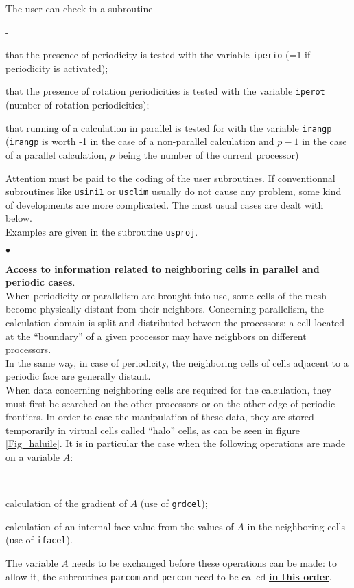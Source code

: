 {{{The user can check in a subroutine
\begin{list}{-}{}
\item that the presence of periodicity is tested with the variable
      \texttt{iperio} (=1 if periodicity is activated);
\item that the presence of rotation periodicities is tested with the variable
      \texttt{iperot} (number of rotation periodicities);
\item that running of a calculation in parallel is tested for with the
      variable \texttt{irangp} (\texttt{irangp} is worth -1 in the case of a
      non-parallel calculation and $p-1$ in the case of a parallel calculation,
      $p$ being the number of the current processor)
\end{list}
Attention must be paid to the coding of the user subroutines. If
conventionnal subroutines like \texttt{usini1} or \texttt{usclim}
usually do not cause any problem, some kind of developments are more
complicated. The most usual cases are dealt with below. \\ Examples are
given in the subroutine \texttt{usproj}.
\begin{list}{$\bullet$}{}
\item {\bf Access to information related to neighboring cells in
      parallel and periodic cases}.\\
When periodicity or parallelism are brought into use, some cells of the
      mesh become physically distant from their neighbors. Concerning
      parallelism, the calculation domain is split and distributed
      between the processors: a cell located at the ``boundary'' of a
      given processor may have neighbors on different processors. \\
In the same way, in case of periodicity, the neighboring cells of cells
      adjacent to a periodic face are generally distant. \\
When data concerning neighboring cells are required for the
      calculation, they must first be searched on the other processors
      or on the other edge of periodic frontiers. In order to ease the
      manipulation of these data, they are stored temporarily in virtual
      cells called ``halo'' cells, as can be seen in figure \ref{Fig_haluile}.
It is in particular the case when the following operations are made on a
      variable $A$:
\begin{list}{-}{}
\item calculation of the gradient of $A$ (use of \texttt{grdcel});
\item calculation of an internal face value from the values of $A$  in
      the neighboring cells (use of \texttt{ifacel}).
\end{list}
The variable $A$ needs to be exchanged before these operations can be
      made: to allow it, the subroutines \texttt{parcom} and
      \texttt{percom} need to be called {\underline {\bf in this order}}.


\end{list}}}}
